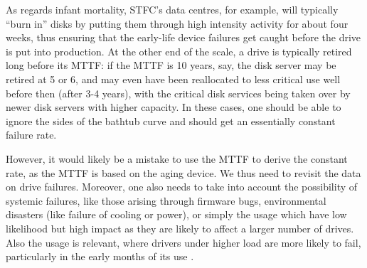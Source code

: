 \documentclass{../../template/esiwace-report}
\begin{document}
As regards infant mortality, STFC's data centres, for example, will typically ``burn in'' disks by putting them through
high intensity activity for about four weeks, thus ensuring that the early-life device failures get caught before the
drive is put into production.  At the other end of the scale, a drive is typically retired long before its MTTF: if the
MTTF is 10 years, say, the disk server may be retired at 5 or 6, and may even have been reallocated to less critical use
well before then (after 3-4 years), with the critical disk services being taken over by newer disk servers with higher
capacity.  In these cases, one should be able to ignore the sides of the bathtub curve and should get an essentially
constant failure rate.

However, it would likely be a mistake to use the MTTF to derive the constant rate, as the MTTF is based on the aging
device.  We thus need to revisit the data on drive failures.  Moreover, one also needs to take into account the
possibility of systemic failures, like those arising through firmware bugs, environmental disasters (like failure of
cooling or power), or simply the usage which have low likelihood but high impact as they are likely to affect a larger
number of drives.  Also the usage is relevant, where drivers under higher load are more likely to fail, particularly in
the early months of its use \cite{pinheiro}.





\end{document}
